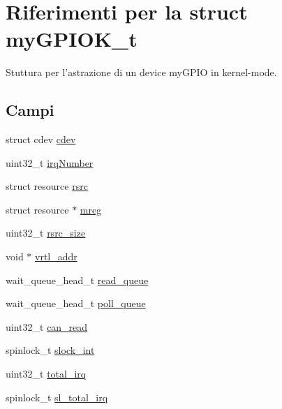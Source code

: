 \hypertarget{structmy_g_p_i_o_k__t}{\section{Riferimenti per la struct my\+G\+P\+I\+O\+K\+\_\+t}
\label{structmy_g_p_i_o_k__t}
}


Stuttura per l'astrazione di un device my\+G\+P\+I\+O in kernel-\/mode.  


\subsection*{Campi}
\begin{DoxyCompactItemize}
\item 
struct cdev \hyperlink{structmy_g_p_i_o_k__t_acba682fe45d5a1501790dbdb1d99bd6a}{cdev}
\item 
uint32\+\_\+t \hyperlink{structmy_g_p_i_o_k__t_a42a1593ebe61611c4e29413903a373a5}{irq\+Number}
\item 
struct resource \hyperlink{structmy_g_p_i_o_k__t_a565a1848c3ae8026257a74cf169c6941}{rsrc}
\item 
struct resource $\ast$ \hyperlink{structmy_g_p_i_o_k__t_a18c4eb95350c67ccb239a8a39c43c09a}{mreg}
\item 
uint32\+\_\+t \hyperlink{structmy_g_p_i_o_k__t_a0f87b53dc5049a349ef01aa586c0b5dc}{rsrc\+\_\+size}
\item 
void $\ast$ \hyperlink{structmy_g_p_i_o_k__t_af5aef493b3c2bc9d1f036ce0acea9bba}{vrtl\+\_\+addr}
\item 
wait\+\_\+queue\+\_\+head\+\_\+t \hyperlink{structmy_g_p_i_o_k__t_a251570f8e6976ad87411093e330e7b4f}{read\+\_\+queue}
\item 
wait\+\_\+queue\+\_\+head\+\_\+t \hyperlink{structmy_g_p_i_o_k__t_a2080617f88cafd765430573afe7701d1}{poll\+\_\+queue}
\item 
uint32\+\_\+t \hyperlink{structmy_g_p_i_o_k__t_a2b8d3d6037e2d2fdadbd7c2fd995f0a1}{can\+\_\+read}
\item 
spinlock\+\_\+t \hyperlink{structmy_g_p_i_o_k__t_a1e1ddf972b4dc84dd331a0c72e5d9895}{slock\+\_\+int}
\item 
uint32\+\_\+t \hyperlink{structmy_g_p_i_o_k__t_a2da711ac290a9613b8d8af97f122b997}{total\+\_\+irq}
\item 
spinlock\+\_\+t \hyperlink{structmy_g_p_i_o_k__t_ac41bbc7fe03ef25b7f468275fb565d78}{sl\+\_\+total\+\_\+irq}
\end{DoxyCompactItemize}


